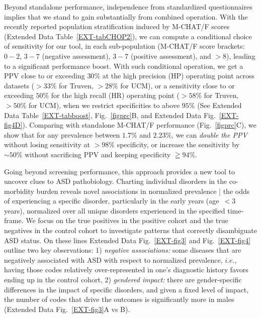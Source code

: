 \documentclass[onecolumn,,10pt]{IEEEtran}
\def\treatment{positive\xspace}
\begin{document}
Beyond standalone performance, independence from standardized questionnaires implies that we stand to gain substantially  from combined operation. With the recently reported population stratification induced by M-CHAT/F scores~\cite{pmid31562252} (Extended Data Table~\ref{EXT-tabCHOP2}), we can compute a conditional choice of sensitivity  for our tool, in each sub-population (M-CHAT/F score brackets: $0-2$, $3-7$ (negative assessment), $3-7$ (positive assessment), and $>8$), leading to a  significant performance boost. With such conditional operation, we get a PPV close to or exceeding $30\%$ at the high precision (HP) operating point across datasets ($>33\%$ for Truven, $>28\%$ for UCM), or a sensitivity close to or exceeding $50\%$ for the high recall (HR) operating point ($>58\%$ for  Truven, $>50\%$ for UCM), when we restrict specificities to above $95\%$ (See Extended Data Table~\ref{EXT-tabboost}, Fig.~\ref{figprc}B, and Extended Data Fig.~\ref{EXT-fig4D}). Comparing   with standalone M-CHAT/F performance (Fig.~\ref{figprc}C), we show that for any prevalence between 
$1.7\%$ and $2.23\%$, we can   \textit{double the PPV} without losing sensitivity at $>98\%$ specificity, or increase the sensitivity by $\sim 50\%$ without sacrificing PPV and  keeping specificity $\geqq 94\%$.%

Going beyond screening performance, this approach provides a new tool to uncover clues to ASD pathobiology. Charting individual disorders in the co-morbidity burden reveals novel associations in normalized prevalence | the odds of experiencing a specific disorder, particularly in the early years (age~$<3$ years), normalized over all unique disorders experienced in the specified time-frame. We focus on  the true positives in the \treatment cohort and the true negatives in the control cohort to investigate  patterns that correctly disambiguate  ASD status. On these lines Extended Data Fig.~\ref{EXT-fig3} and Fig.~\ref{EXT-fig4} outline two key  observations: 1) \textit{negative associations:} some  diseases that are negatively associated with ASD  with respect to normalized prevalence, $i.e.$, having those codes relatively  over-represented  in one's diagnostic history favors ending up in the control cohort, 2) \textit{gendered impact:} there are gender-specific differences in the impact of specific disorders,  and given a fixed level of impact, the number of codes that drive the outcomes is significantly more in males (Extended Data Fig.~\ref{EXT-fig3}A vs B).
\end{document}
